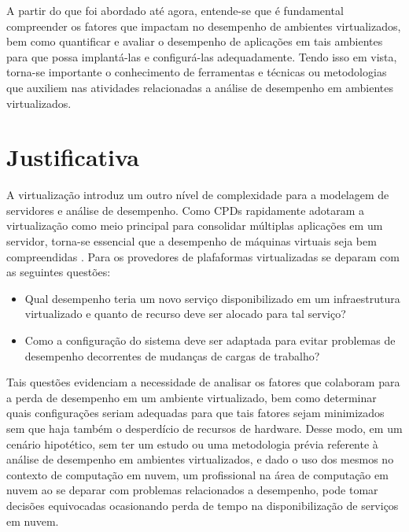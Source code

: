 A partir do que foi abordado até agora, entende-se que é fundamental compreender os fatores que impactam no desempenho de ambientes virtualizados, bem como quantificar e avaliar o desempenho de aplicações em tais ambientes para que possa implantá-las e configurá-las adequadamente. Tendo isso em vista, torna-se importante o conhecimento de ferramentas e técnicas ou metodologias que auxiliem nas atividades relacionadas a análise de desempenho em ambientes virtualizados. 



\section{Justificativa}
A virtualização introduz um outro nível de complexidade para a modelagem de servidores e análise de desempenho. Como CPDs rapidamente adotaram a virtualização como meio principal para consolidar múltiplas aplicações em um servidor, torna-se essencial que a desempenho de máquinas virtuais seja bem compreendidas \cite{ticko2010}. Para  os provedores de plafaformas virtualizadas se deparam com as seguintes questões:

\begin{itemize}
  \item Qual desempenho teria um novo serviço disponibilizado em um infraestrutura virtualizado e quanto de recurso deve ser alocado para tal serviço?

  \item Como a configuração do sistema deve ser adaptada para evitar problemas de desempenho decorrentes de mudanças de cargas de trabalho?
\end{itemize}


Tais questões evidenciam a necessidade de analisar os fatores que colaboram para a perda de desempenho em um ambiente virtualizado, bem como determinar quais configurações seriam adequadas para que tais fatores sejam minimizados sem que haja também o desperdício de recursos de hardware. Desse modo, em um cenário hipotético, sem ter um estudo ou uma metodologia prévia referente à análise de desempenho em ambientes virtualizados, e dado o uso dos mesmos no contexto de computação em nuvem, um profissional na área de computação em nuvem ao se deparar com problemas relacionados a desempenho, pode tomar decisões equivocadas ocasionando perda de tempo na disponibilização de serviços em nuvem.



